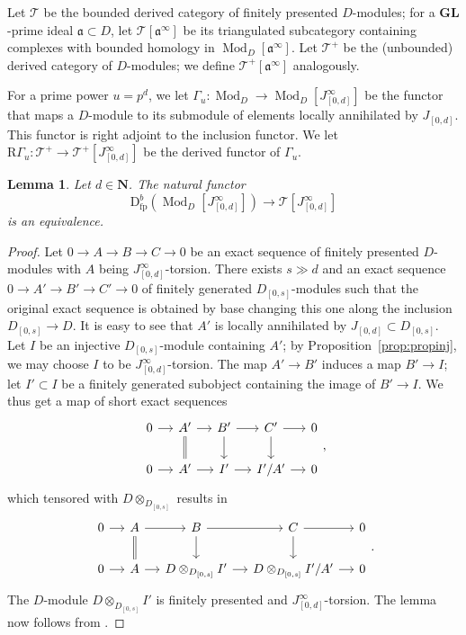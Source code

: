 \documentclass[12pt]{amsart}
\newcommand{\rD}{\mathrm{D}}
\newcommand{\bN}{\mathbf{N}}
\newcommand{\rR}{\mathrm{R}}
\newcommand{\cT}{\mathcal{T}}
\newcommand{\fa}{\mathfrak{a}}
\DeclareMathOperator{\Mod}{Mod}
\DeclareMathOperator{\fpre}{fp}
\newcommand{\GL}{\mathbf{GL}}
\newcommand{\mGau}{\Gamma_{u}}
\numberwithin{equation}{section}
\newtheorem{lemma}[equation]{Lemma}
\theoremstyle{definition}
\theoremstyle{plain}
\begin{document}
Let $\cT$ be the bounded derived category of finitely presented $D$-modules; for a $\GL$-prime ideal $\fa \subset D$, let $\cT[\fa^{\infty}]$ be its triangulated subcategory containing complexes with bounded homology in $\Mod_D[\fa^{\infty}]$. 
Let $\cT^+$ be the (unbounded) derived category of $D$-modules; we define $\cT^+[\fa^{\infty}]$ analogously.

For a prime power $u = p^d$, we let $\mGau \colon \Mod_D \to \Mod_D[J_{[0,d]}^{\infty}]$ be the functor that maps a $D$-module to its submodule of elements locally annihilated by $J_{[0,d]}$.
This functor is right adjoint to the inclusion functor.
We let $\rR \mGau \colon \cT^+ \to \cT^+[J_{[0,d]}^{\infty}]$ be the derived functor of $\mGau$. 

\begin{lemma}\label{lem:equiv}
Let $d \in \bN$. The natural functor
\[\rD^b_{\fpre}(\Mod_D[J_{[0,d]}^{\infty}]) \to \cT[J_{[0,d]}^{\infty}] \] 
is an equivalence.
\end{lemma}
\begin{proof}
    Let $0 \to A \to B \to C \to 0$ be an exact sequence of finitely presented $D$-modules with $A$ being $J_{[0,d]}^{\infty}$-torsion. There exists $s \gg d$ and an exact sequence $0 \to A' \to B' \to C' \to 0$ of finitely generated $D_{[0,s]}$-modules such that the original exact sequence is obtained by base changing this one along the inclusion $D_{[0,s]} \to D$. It is easy to see that $A'$ is locally annihilated by $J_{[0,d]} \subset D_{[0,s]}$. Let $I$ be an injective $D_{[0,s]}$-module containing $A'$; by Proposition~\ref{prop:propinj}, we may choose $I$ to be $J_{[0,d]}^{\infty}$-torsion. The map $A' \to B'$ induces a map $B' \to I$; let $I' \subset I$ be a finitely generated subobject containing the image of $B' \to I$. We thus get a map of short exact sequences
   \[\begin{tikzcd}[column sep=small]
	0 & {A'} & {B'} & {C'} & 0 \\
	0 & {A'} & {I'} & {I'/A'} & 0
	\arrow[from=1-1, to=1-2]
	\arrow[from=1-2, to=1-3]
	\arrow[equals, from=1-2, to=2-2]
	\arrow[from=1-3, to=1-4]
	\arrow[from=1-3, to=2-3]
	\arrow[from=1-4, to=1-5]
	\arrow[from=1-4, to=2-4]
	\arrow[from=2-1, to=2-2]
	\arrow[from=2-2, to=2-3]
	\arrow[from=2-3, to=2-4]
	\arrow[from=2-4, to=2-5]
\end{tikzcd},\]
which tensored with $D \otimes_{D_{[0,s]}}$ results in 
  \[\begin{tikzcd}[column sep=small]
	0 & {A} & {B} & {C} & 0 \\
	0 & {A} & D \otimes_{D_{[0,s]}} {I'} & D \otimes_{D_{[0,s]}} {I'/A'} & 0
	\arrow[from=1-1, to=1-2]
	\arrow[from=1-2, to=1-3]
	\arrow[equals, from=1-2, to=2-2]
	\arrow[from=1-3, to=1-4]
	\arrow[from=1-3, to=2-3]
	\arrow[from=1-4, to=1-5]
	\arrow[from=1-4, to=2-4]
	\arrow[from=2-1, to=2-2]
	\arrow[from=2-2, to=2-3]
	\arrow[from=2-3, to=2-4]
	\arrow[from=2-4, to=2-5]
\end{tikzcd}.\]
The $D$-module $D\otimes_{D_{[0,s]}} I'$ is finitely presented and $J_{[0,d]}^\infty$-torsion. The lemma now follows from \cite[1.15 Lemma c(1)]{kel99ex}.
\end{proof}
\end{document}

